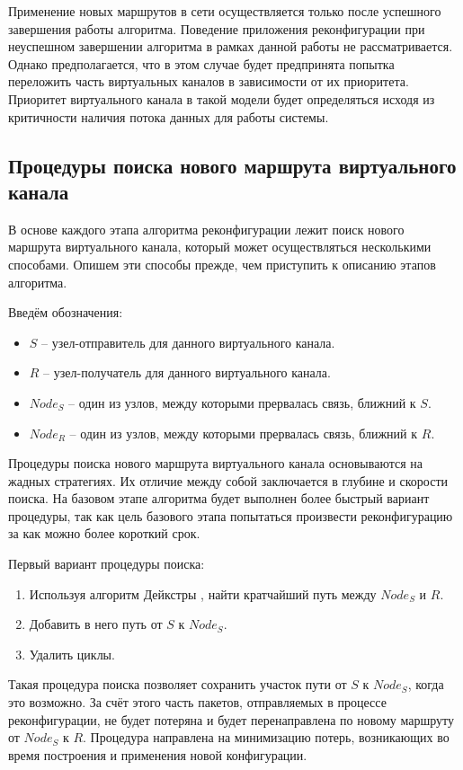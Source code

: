 \documentclass[12pt, a4paper]{article}
\begin{document}
Применение новых маршрутов в сети осуществляется только после успешного завершения работы алгоритма. Поведение приложения реконфигурации при неуспешном завершении алгоритма в рамках данной работы не рассматривается. Однако предполагается, что в этом случае будет предпринята попытка переложить часть виртуальных каналов в зависимости от их приоритета. Приоритет виртуального канала в такой модели будет определяться исходя из критичности наличия потока данных для работы системы.  

\FloatBarrier

\subsection{Процедуры поиска нового маршрута виртуального канала} \label{subsec:procalg}
В основе каждого этапа алгоритма реконфигурации лежит поиск нового маршрута виртуального канала, который может осуществляться несколькими способами. Опишем эти способы прежде, чем приступить к описанию этапов алгоритма.

Введём обозначения:
\begin{itemize}
	\item $S$ -- узел-отправитель для данного виртуального канала.
	\item $R$ -- узел-получатель для данного виртуального канала.
	\item $Node_{S}$ – один из узлов, между которыми прервалась связь, ближний к $S$.
	\item $Node_{R}$ – один из узлов, между которыми прервалась связь, ближний к $R$.
\end{itemize}

Процедуры поиска нового маршрута виртуального канала основываются на жадных стратегиях. Их отличие между собой заключается в глубине и скорости поиска. На базовом этапе алгоритма будет выполнен более быстрый вариант процедуры, так как цель базового этапа попытаться произвести реконфигурацию за как можно более короткий срок.

Первый вариант процедуры поиска:
\begin{enumerate}
	\item Используя алгоритм Дейкстры \cite{dejkstra}, найти кратчайший путь между $Node_{S}$ и $R$.
	\item Добавить в него путь от $S$ к $Node_{S}$.
	\item Удалить циклы.
\end{enumerate}

Такая процедура поиска позволяет сохранить участок пути от $S$ к $Node_{S}$, когда это возможно. За счёт этого часть пакетов, отправляемых в процессе реконфигурации, не будет потеряна и будет перенаправлена по новому маршруту от $Node_{S}$ к $R$. Процедура направлена на минимизацию потерь, возникающих во время построения и применения новой конфигурации.
\end{document}
